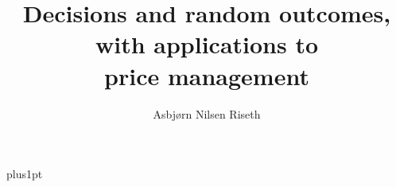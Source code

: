 \documentclass[12pt,fleqn]{ociamthesis}
\title{Decisions and random outcomes,\\ with applications to\\ price management}
\author{Asbj{\o}rn Nilsen Riseth}
\def\biblio{}
\def\chtodolist{\listoftodos}
\begin{document}
\def\biblio{} %
\def\chtodolist{}

\baselineskip=18pt plus1pt

\setcounter{secnumdepth}{3}
\setcounter{tocdepth}{3}


\maketitle                  %
\begin{dedication}
\end{dedication}

\begin{acknowlegements}
\end{acknowlegements}

\begin{abstract}
\end{abstract}

\begin{originality}
  
\end{originality}

\begin{romanpages}          %
  \listoftodos
  \tableofcontents            %
  \listoffigures              %
  \listoftables               %
\end{romanpages}            %












\appendix



\end{document}
